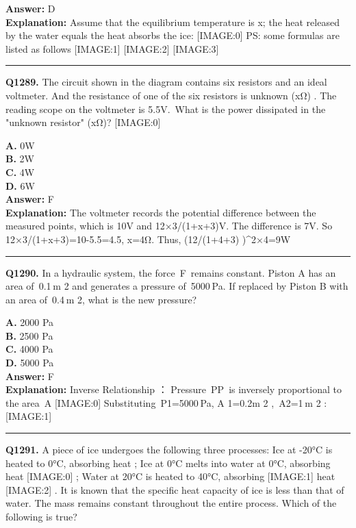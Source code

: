 \documentclass[12pt]{article}
\begin{document}
\textbf{Answer:} D \\
\textbf{Explanation:} Assume that the equilibrium temperature is x; the heat released by the water equals the heat absorbs the ice:
[IMAGE:0]
PS: some formulas are listed as follows
[IMAGE:1]
[IMAGE:2]
[IMAGE:3]

\hrule
\vspace{1em}


\noindent
\textbf{Q1289.} The circuit shown in the diagram contains six resistors and an ideal voltmeter. And the resistance of one of the six resistors is unknown (xΩ) . The reading scope on the voltmeter is 5.5V. What is the power dissipated in the "unknown resistor" (xΩ)?
[IMAGE:0]



\textbf{A.} 0W \\
\textbf{B.} 2W \\
\textbf{C.} 4W \\
\textbf{D.} 6W \\

\textbf{Answer:} F \\
\textbf{Explanation:} The voltmeter records the potential difference between the measured points, which is 10V and 12×3/(1+x+3)V. The difference is 7V.
So 12×3/(1+x+3)=10-5.5=4.5, x=4Ω.
Thus, (12/(1+4+3) )^2×4=9W

\hrule
\vspace{1em}


\noindent
\textbf{Q1290.} In a hydraulic system, the force F remains constant. Piston A has an area of 0.1 m
2
and generates a pressure of 5000 Pa. If replaced by Piston B with an area of 0.4 m
2,
what is the new pressure?



\textbf{A.} 2000 Pa \\
\textbf{B.} 2500 Pa \\
\textbf{C.} 4000 Pa \\
\textbf{D.} 5000 Pa \\

\textbf{Answer:} F \\
\textbf{Explanation:} Inverse Relationship
：
Pressure PP is inversely proportional to the area A
[IMAGE:0]
Substituting P1=5000 Pa,
A
1​=0.2m
2
, A2=1 m
2
:
[IMAGE:1]

\hrule
\vspace{1em}


\noindent
\textbf{Q1291.} A piece of ice undergoes the following three processes:
Ice at -20°C is heated to 0°C, absorbing heat
;
Ice at 0°C melts into water at 0°C, absorbing heat
[IMAGE:0]
;
Water at 20°C is heated to 40°C, absorbing
[IMAGE:1]
heat
[IMAGE:2]
.
It is known that the specific heat capacity of ice is less than that of water. The mass remains constant throughout the entire process. Which of the following is true?
\end{document}
